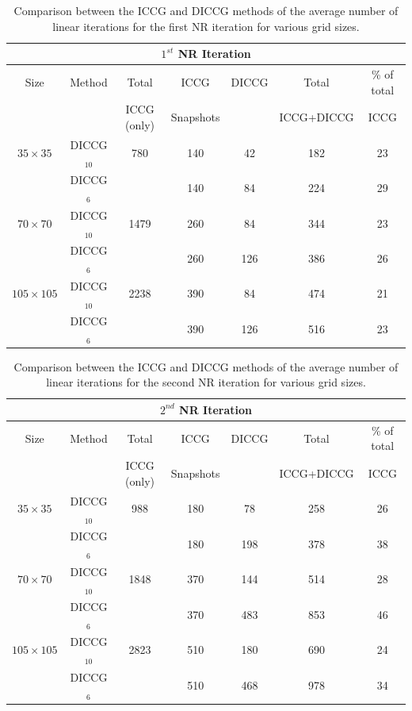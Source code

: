 \documentclass[12pt]{article}
\begin{document}
\begin{table}[!h]
\begin{minipage}{1\textwidth}
\vspace{-10pt}
\centering
\begin{tabular}{ |c|c|c|c|c|c|c|} 
\hline
\multicolumn{7}{|c|}{$1^{st}$ NR Iteration}  \\
\hline

Size&Method& Total & ICCG&DICCG &Total&\% of total\\
                           &      & ICCG (only) & Snapshots& &ICCG+DICCG& ICCG\\
\hline
$35\times35$ &DICCG$_{10}$&780&140&42 &182  &23 \\
&DICCG$_6$& &140&84&224 & 29\\
\hline
$70\times70$ &DICCG$_{10}$& 1479&260&84&344  &23 \\
 &DICCG$_6$& &260&126&  386&26 \\
\hline
$105\times105$ &DICCG$_{10}$&2238&390&84 & 474 &21 \\
 &DICCG$_6$& &390&126&  516&23 \\
 \hline
 \end{tabular}
\caption{Comparison between the ICCG and DICCG methods of the average number of linear iterations for the first NR iteration for various grid sizes.}\label{table:litertots1}
\end{minipage}
\end{table}




\begin{table}[h]
\begin{minipage}{1\textwidth}
\vspace{-10pt}
\centering
\begin{tabular}{ |c|c|c|c|c|c|c|} 

\hline
\multicolumn{7}{|c|}{$2^{nd}$ NR Iteration}  \\
\hline
Size&Method& Total & ICCG&DICCG &Total&\% of total\\
                           &      & ICCG (only) & Snapshots& &ICCG+DICCG& ICCG\\
\hline
$35\times35$ &DICCG$_{10}$&988&180&78 &258  &26 \\
&DICCG$_6$& &180&198& 378 & 38\\
\hline
$70\times70$ &DICCG$_{10}$& 1848&370&144& 514 &28 \\
 &DICCG$_6$& &370&483&853  &46 \\
\hline
$105\times105$ &DICCG$_{10}$& 2823&510&180&690  &24 \\
 &DICCG$_6$& &510&468& 978 &34 \\
 \hline
 \end{tabular}
\caption{Comparison between the ICCG and DICCG methods of the average number of linear iterations for the second NR iteration for various grid sizes. }\label{table:litertots2}
\end{minipage}
\end{table}
\clearpage
\end{document}
